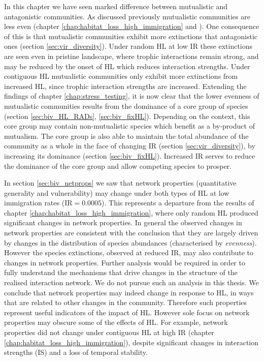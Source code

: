 In this chapter we have seen marked difference between mutualistic and antagonistic communities. As discussed previously mutualistic communities are less even (chapter \ref{chap:habitat_loss_high_immigration} and \cite{lurgi2015effects}). One consequence of this is that mutualistic communities exhibit more extinctions that antagonistic ones (section \ref{sec:vir_diversity}). Under random HL at low IR these extinctions are seen even in pristine landscape, where trophic interactions remain strong, and may be reduced by the onset of HL which reduces interaction strengths. Under contiguous HL mutualistic communities only exhibit more extinctions from increased HL, since trophic interaction strengths are increased. Extending the findings of chapter \ref{chap:stress_testing}, it is now clear that the lower evenness of mutualistic communities results from the dominance of a core group of species (section \ref{sec:biv_HL_RADs}, \ref{sec:biv_fixHL}). Depending on the context, this core group may contain non-mutualistic species which benefit as a by-product of mutualism. The core group is also able to maintain the total abundance of the community as a whole in the face of changing IR (section \ref{sec:vir_diversity}), by increasing its dominance (section \ref{sec:biv_fixHL}). Increased IR serves to reduce the dominance of the core group and allow competing species to prosper.

In section \ref{sec:biv_netprops} we saw that network properties (quantitative generality and vulnerability) may change under both types of HL at low immigration rates (IR$=0.0005$). This represents a departure from the results of chapter \ref{chap:habitat_loss_high_immigration}, where only random HL produced significant changes in network properties. In general the observed changes in network properties are consistent with the conclusion that they are largely driven by changes in the distribution of species abundances (characterised by \emph{evenness}). However the species extinctions, observed at reduced IR, may also contribute to changes in network properties. Further analysis would be required in order to fully understand the mechanisms that drive changes in the structure of the realised interaction network. We do not pursue such an analysis in this thesis. We conclude that network properties may indeed change in response to HL, in ways that are related to other changes in the community. Therefore such properties represent useful indicators of the impact of HL. However sole focus on network properties may obscure some of the effects of HL. For example, network properties did not change under contiguous HL at high IR (chapter \ref{chap:habitat_loss_high_immigration}), despite significant changes in interaction strengths (IS) and a loss of temporal stability.    

